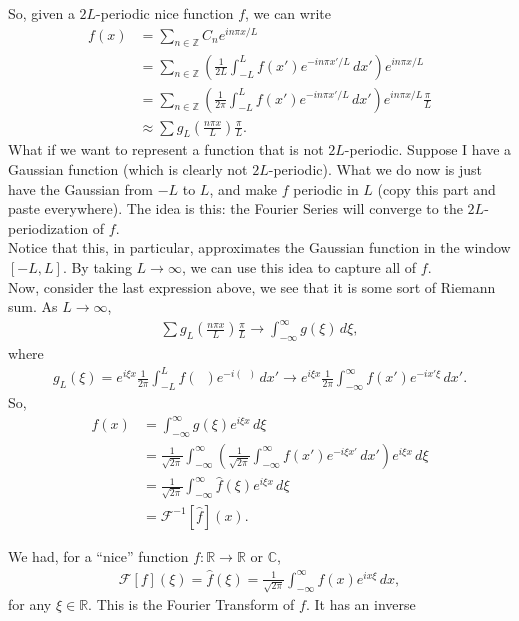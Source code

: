 \documentclass{article}
\theoremstyle{definition}
\newcommand{\R}{\mathbb{R}}
\newcommand{\F}{\mathcal{F}}
\begin{document}
So, given a $2L$-periodic nice function $f$, we can write
\begin{align*}
f(x) &= \sum_{n\in \mathbb{Z}}C_ne^{in\pi x/L}\\
&= \sum_{n\in \mathbb{Z}}\left(\frac{1}{2L}\int^L_{-L}f(x')e^{-in\pi x'/L}\,dx'\right)e^{in\pi x/L}\\
&= \sum_{n\in \mathbb{Z}}\left(\frac{1}{2\pi}\int^L_{-L}f(x')e^{-in\pi x'/L}\,dx' \right)  e^{in\pi x/L}\frac{\pi}{L}\\
&\approx \sum g_L\left(\frac{n\pi x}{L}\right)\frac{\pi}{L}.
\end{align*}
What if we want to represent a function that is not $2L$-periodic. Suppose I have a Gaussian function (which is clearly not $2L$-periodic). What we do now is just have the Gaussian from $-L$ to $L$, and make $f$ periodic in $L$ (copy this part and paste everywhere). The idea is this: the Fourier Series will converge to the $2L$-periodization of $f$. \\

Notice that this, in particular, approximates the Gaussian function in the window $[-L,L]$. By taking $L\to\infty$, we can use this idea to capture all of $f$.\\

Now, consider the last expression above, we see that it is some sort of Riemann sum. As $L \to \infty$, 
\begin{align*}
\sum g_L\left(\frac{n\pi x}{L}\right)\frac{\pi}{L} \to \int^\infty_{-\infty}g(\xi)\,d\xi,
\end{align*}
where
\begin{align*}
g_L(\xi) = e^{i\xi x}\frac{1}{2\pi}\int^L_{-L}f(\,\,\,)e^{-i(\,\,\,)}\,dx' \to e^{i\xi x}\frac{1}{2\pi}\int^\infty_{-\infty}f(x')e^{-ix'\xi}\,dx'.
\end{align*}
So,
\begin{align*}
f(x) &= \int^\infty_{-\infty}g(\xi)e^{i\xi x}\,d\xi\\
&= \frac{1}{\sqrt{2\pi}}\int^\infty_{-\infty}\left(\frac{1}{\sqrt{2\pi}}\int^\infty_{-\infty}f(x')e^{-i\xi x'}\,dx' \right)e^{i\xi x}\,d\xi\\
&=\frac{1}{\sqrt{2\pi}}\int^\infty_{-\infty}\hat{f}(\xi)e^{i\xi x}\,d\xi\\
&= \F^{-1}[\hat{f}](x).
\end{align*}



We had, for a ``nice'' function $f:\R \to \R$ or $\mathbb{C}$,
\begin{align*}
\F[f](\xi) = \hat{f}(\xi) = \frac{1}{\sqrt{2\pi}}\int^\infty_{-\infty} f(x)e^{ix\xi}\,dx,
\end{align*}
for any $\xi \in \R$. This is the Fourier Transform of $f$. It has an inverse
\end{document}
